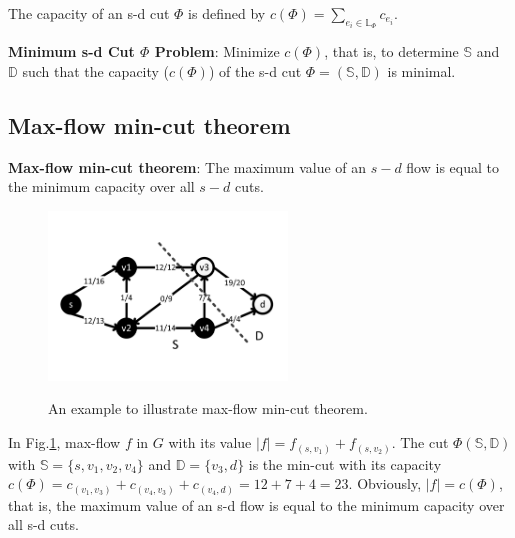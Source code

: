 The capacity of an s-d cut $\Phi$ is defined by $c(\Phi)=\sum\limits_{e_i\in \mathbb{\mathbb{L}}_{\Phi}}c_{e_i}$.

\textbf{Minimum s-d Cut $\Phi$ Problem}: Minimize $c(\Phi)$, that is, to determine $\mathbb{S}$ and $\mathbb{D}$ such that the capacity ($c(\Phi)$) of the s-d cut ${\Phi}=(\mathbb{S},\mathbb{D})$ is minimal.




\subsection{Max-flow min-cut theorem}
\textbf{Max-flow min-cut theorem}: The maximum value of an $s-d$ flow is equal to the minimum capacity over all $s-d$ cuts.
\begin{figure}[tp]
  \centering
  \includegraphics[width=2.5in]{franz//FlowNetwork}\\
  \caption{An example to illustrate max-flow min-cut theorem. }
  \label{fig:FlowNetwork}
\end{figure}
 In Fig.\ref{fig:FlowNetwork}, max-flow $f$ in $G$ with its value $|f|=f_{(s,v_1)}+f_{(s,v_2)}$. The cut $\Phi(\mathbb{S},\mathbb{D})$ with $\mathbb{S}=\{s,v_1,v_2,v_4\}$ and $\mathbb{D}=\{v_3,d\}$ is the min-cut with its capacity $c(\Phi)=c_{(v_1,v_3)}+c_{(v_4,v_3)}+c_{(v_4,d)}=12+7+4=23$. Obviously, $|f|=c(\Phi)$, that is, the maximum value of an s-d flow is equal to the minimum capacity over all s-d cuts.

